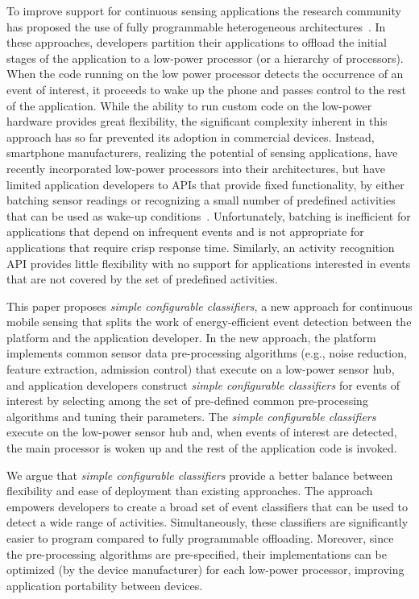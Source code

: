 To improve support for continuous sensing applications the research
community has proposed the use of fully programmable heterogeneous
architectures~\cite{reflex,littlerock,turducken}.  In these
approaches, developers partition their applications to offload the
initial stages of the application to a low-power processor (or a
hierarchy of processors).  When the code running on the low power
processor detects the occurrence of an event of interest, it proceeds
to wake up the phone and passes control to the rest of the
application.  While the ability to run custom code on the low-power
hardware provides great flexibility, the significant complexity
inherent in this approach has so far prevented its adoption in
commercial devices.  Instead, smartphone manufacturers, realizing the
potential of sensing applications, have recently incorporated
low-power processors into their architectures, but have limited
application developers to APIs that provide fixed functionality, by
either batching sensor readings or recognizing a small number of
predefined activities that can be used as wake-up
conditions~\cite{androidMotionSensors,coreMotion,motox}.
Unfortunately, batching is inefficient for applications that depend on
infrequent events and is not appropriate for applications that require
crisp response time.  Similarly, an activity recognition API provides
little flexibility with no support for applications interested in
events that are not covered by the set of predefined activities.

This paper proposes {\em simple configurable classifiers}, a new
approach for continuous mobile sensing that splits the work of
energy-efficient event detection between the platform and the
application developer.  In the new approach, the platform implements
common sensor data pre-processing algorithms (e.g., noise reduction,
feature extraction, admission control) that execute on a low-power sensor hub, and
application developers construct {\em simple configurable classifiers}
for events of interest by selecting among the set of pre-defined
common pre-processing algorithms and tuning their parameters.  The
{\em simple configurable classifiers} execute on the low-power sensor
hub and, when events of interest are detected, the main processor is
woken up and the rest of the application code is invoked.
  
We argue that {\em simple configurable classifiers} provide a better
balance between flexibility and ease of deployment than existing
approaches.  The approach empowers developers to create a broad set of
event classifiers that can be used to detect a wide range of
activities.  Simultaneously, these classifiers are significantly
easier to program compared to fully programmable offloading.
Moreover, since the pre-processing algorithms are pre-specified, their
implementations can be optimized (by the device manufacturer) for each
low-power processor, improving application portability between
devices.  

